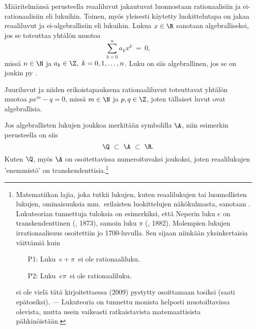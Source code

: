 Määritelmänsä perusteella reaaliluvut jakautuvat luonnostaan rationaalisiin ja ei-rationaalisiin
%
eli  lukuihin. Toinen, myös yleisesti käytetty luokittelutapa on jakaa 
reaaliluvut  ja ei-algebrallisiin eli  lukuihin. 
Lukua $x \in \R$ sanotaan algebralliseksi, jos se toteuttaa yhtälön muotoa
\[
\sum_{k=0}^n a_k x^k\ =\ 0,
\]
missä $n \in \N$ ja $a_k \in \Z,\ k = 0,1,\ldots,n$. Luku on siis algebrallinen, jos se on 
jonkin  py .
\begin{Exa} Juuriluvut ja niiden erikoistapauksena rationaaliluvut toteuttavat yhtälön muotoa 
$p x^m - q = 0$, missä $m \in \N$ ja $p,q \in \Z$, joten tällaiset luvut ovat algebrallisia. 
\loppu \end{Exa}
Jos algebrallisten lukujen joukkoa merkitään symbolilla $\A$, niin esimerkin perusteella on siis
\[ 
\Q\ \subset\ \A\ \subset\ \R. 
\]
Kuten $\Q$, myös $\A$ on osoitettavissa numeroituvaksi joukoksi, joten reaalilukujen 'enemmistö'
on transkendenttisia.\footnote[2]{Matematiikan lajia, joka tutkii lukujen, kuten reaalilukujen
tai luonnollisten lukujen, ominaisuuksia mm.\ erilaisten luokittelujen näkökulmasta, sanotaan 
. Lukuteorian tunnettuja tuloksia on esimerkiksi, että Neperin luku $e$ on 
transkendenttinen (, 1873), samoin luku $\pi$ 
(, 1882). Molempien lukujen irrationaalisuus osoitettiin jo 
1700-luvulla. 
Sen sijaan niinkään yksinkertaisia väittämiä kuin
\begin{itemize}
\item[P1:] Luku $\,e + \pi\,$ ei ole rationaaliluku.
\item[P2:] Luku $\,e \pi\,$ ei ole rationaaliluku.
\end{itemize}
ei ole vielä tätä kirjoitettaessa (2009) pystytty osoittamaan tosiksi (saati epätosiksi). 
--- Lukuteoria on  tunnettu monista helposti muotoiltavissa olevista, mutta usein vaikeasti 
ratkaistavista matemaattisista pähkinöistään.}

